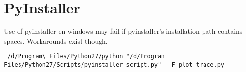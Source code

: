 \section{PyInstaller}

Use of pyinstaller on windows may fail if pyinstaller's installation path
contains spaces. Workarounds exist though.

\begin{verbatim}
 /d/Program\ Files/Python27/python "/d/Program Files/Python27/Scripts/pyinstaller-script.py"  -F plot_trace.py
\end{verbatim}